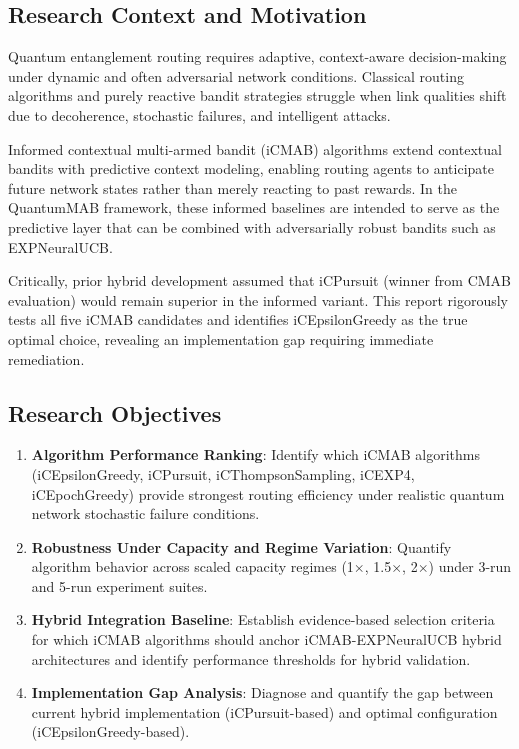 \documentclass[12pt,a4paper]{article}
\begin{document}
\subsection{Research Context and Motivation}
Quantum entanglement routing requires adaptive, context-aware decision-making under dynamic and often adversarial network conditions. Classical routing algorithms and purely reactive bandit strategies struggle when link qualities shift due to decoherence, stochastic failures, and intelligent attacks.

Informed contextual multi-armed bandit (iCMAB) algorithms extend contextual bandits with predictive context modeling, enabling routing agents to anticipate future network states rather than merely reacting to past rewards. In the QuantumMAB framework, these informed baselines are intended to serve as the predictive layer that can be combined with adversarially robust bandits such as EXPNeuralUCB.

Critically, prior hybrid development assumed that iCPursuit (winner from CMAB evaluation) would remain superior in the informed variant. This report rigorously tests all five iCMAB candidates and identifies iCEpsilonGreedy as the true optimal choice, revealing an implementation gap requiring immediate remediation.

\subsection{Research Objectives}
\begin{enumerate}
\item \textbf{Algorithm Performance Ranking}: Identify which iCMAB algorithms (iCEpsilonGreedy, iCPursuit, iCThompsonSampling, iCEXP4, iCEpochGreedy) provide strongest routing efficiency under realistic quantum network stochastic failure conditions.
\item \textbf{Robustness Under Capacity and Regime Variation}: Quantify algorithm behavior across scaled capacity regimes (1$\times$, 1.5$\times$, 2$\times$) under 3-run and 5-run experiment suites.
\item \textbf{Hybrid Integration Baseline}: Establish evidence-based selection criteria for which iCMAB algorithms should anchor iCMAB-EXPNeuralUCB hybrid architectures and identify performance thresholds for hybrid validation.
\item \textbf{Implementation Gap Analysis}: Diagnose and quantify the gap between current hybrid implementation (iCPursuit-based) and optimal configuration (iCEpsilonGreedy-based).
\end{enumerate}
\end{document}
